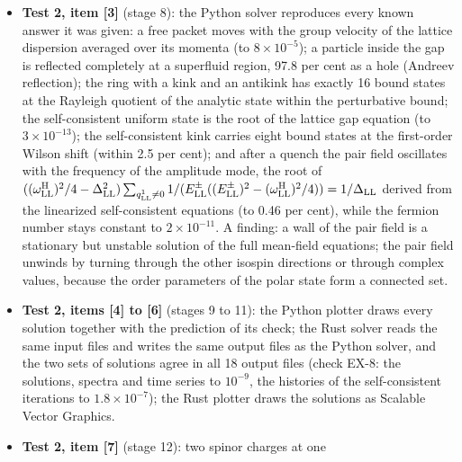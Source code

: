 \documentclass[
  10pt,
]{article}
\begin{document}
\begin{itemize}
  exactly \(\pm m_{\rm LL}\) (four of each per wall; the energies
  \(\pm(m_{\rm LL}^2+2k^{\rm K}_{\rm LL}\Delta^\infty_{\rm LL}/\ell^{\rm K}_{\rm LL}-(k^{\rm K}_{\rm LL}/\ell^{\rm K}_{\rm LL})^2)^{1/2}\)
  give all bound states), which the Wilson term shifts by
  \(r^{\rm W}_{\rm LL}\ell^{\rm x}_{\rm LL}/6\) on the lattice; and the
  Landau levels are
  \(\pm(m_{\rm LL}^2+(q^3_{\rm LL})^2+2n^{\rm L}_{\rm LL}\lvert B^\uparrow_{\rm LL}\rvert)^{1/2}\),
  with different fields for the two isospin components.
\item
  \textbf{Test 2, item {[}3{]}} (stage 8): the Python solver reproduces
  every known answer it was given: a free packet moves with the group
  velocity of the lattice dispersion averaged over its momenta (to
  \(8\times10^{-5}\)); a particle inside the gap is reflected completely
  at a superfluid region, 97.8 per cent as a hole (Andreev reflection);
  the ring with a kink and an antikink has exactly 16 bound states at
  the Rayleigh quotient of the analytic state within the perturbative
  bound; the self-consistent uniform state is the root of the lattice
  gap equation (to \(3\times10^{-13}\)); the self-consistent kink
  carries eight bound states at the first-order Wilson shift (within 2.5
  per cent); and after a quench the pair field oscillates with the
  frequency of the amplitude mode, the root of
  \(((\omega^{\rm H}_{\rm LL})^2/4-\Delta_{\rm LL}^2)\sum_{q^1_{\rm LL}\neq0}1/(E^\pm_{\rm LL}((E^\pm_{\rm LL})^2-(\omega^{\rm H}_{\rm LL})^2/4))=1/\Delta_{\rm LL}\)
  derived from the linearized self-consistent equations (to 0.46 per
  cent), while the fermion number stays constant to \(2\times10^{-11}\).
  A finding: a wall of the pair field is a stationary but unstable
  solution of the full mean-field equations; the pair field unwinds by
  turning through the other isospin directions or through complex
  values, because the order parameters of the polar state form a
  connected set.
\item
  \textbf{Test 2, items {[}4{]} to {[}6{]}} (stages 9 to 11): the Python
  plotter draws every solution together with the prediction of its
  check; the Rust solver reads the same input files and writes the same
  output files as the Python solver, and the two sets of solutions agree
  in all 18 output files (check EX-8: the solutions, spectra and time
  series to \(10^{-9}\), the histories of the self-consistent iterations
  to \(1.8\times10^{-7}\)); the Rust plotter draws the solutions as
  Scalable Vector Graphics.
\item
  \textbf{Test 2, item {[}7{]}} (stage 12): two spinor charges at one

\end{itemize}
\end{document}
